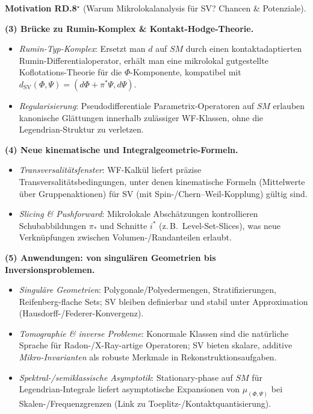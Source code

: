 \documentclass[10pt, letterpaper]{article}
\newcommand{\CustomHeading}[3]{%
  \par\medskip\noindent%
  \textbf{#1 #2} \textnormal{(#3)}.\enskip%
}
\newenvironment{MOT}[2]{\begin{unitbox}\CustomHeading{Motivation}{#1}{#2}}{\end{unitbox}}
\begin{document}
\begin{MOT}{RD.8$^\star$}{Warum Mikrolokalanalysis für SV? Chancen \& Potenziale}
\medskip\noindent
\textbf{(3) Brücke zu Rumin-Komplex \& Kontakt-Hodge-Theorie.}
\begin{itemize}
  \item \emph{Rumin-Typ-Komplex}: Ersetzt man $d$ auf $SM$ durch einen kontaktadaptierten Rumin-Differentialoperator, erhält man eine mikrolokal gutgestellte Koflotations-Theorie für die $\Phi$-Komponente, kompatibel mit $d_{\mathrm{SV}}(\Phi,\Psi)=(d\Phi+\pi^*\Psi,d\Psi)$.
  \item \emph{Regularisierung}: Pseudodifferentiale Parametrix-Operatoren auf $SM$ erlauben kanonische Glättungen innerhalb zulässiger WF-Klassen, ohne die Legendrian-Struktur zu verletzen.
\end{itemize}

\medskip\noindent
\textbf{(4) Neue kinematische und Integralgeometrie-Formeln.}
\begin{itemize}
  \item \emph{Transversalitätsfenster}: WF-Kalkül liefert präzise Transversalitätsbedingungen, unter denen kinematische Formeln (Mittelwerte über Gruppenaktionen) für SV (mit Spin-/Chern–Weil-Kopplung) gültig sind.
  \item \emph{Slicing \& Pushforward}: Mikrolokale Abschätzungen kontrollieren Schubabbildungen $\pi_*$ und Schnitte $i^*$ (z.\,B.\ Level-Set-Slices), was neue Verknüpfungen zwischen Volumen-/Randanteilen erlaubt.
\end{itemize}

\medskip\noindent
\textbf{(5) Anwendungen: von singulären Geometrien bis Inversionsproblemen.}
\begin{itemize}
  \item \emph{Singuläre Geometrien}: Polygonale/Polyedermengen, Stratifizierungen, Reifenberg-flache Sets; SV bleiben definierbar und stabil unter Approximation (Hausdorff-/Federer-Konvergenz).
  \item \emph{Tomographie \& inverse Probleme}: Konormale Klassen sind die natürliche Sprache für Radon-/X-Ray-artige Operatoren; SV bieten skalare, additive \emph{Mikro-Invarianten} als robuste Merkmale in Rekonstruktionsaufgaben.
  \item \emph{Spektral-/semiklassische Asymptotik}: Stationary-phase auf $SM$ für Legendrian-Integrale liefert asymptotische Expansionen von $\mu_{(\Phi,\Psi)}$ bei Skalen-/Frequenzgrenzen (Link zu Toeplitz-/Kontaktquantisierung).
\end{itemize}


\end{MOT}
\end{document}
